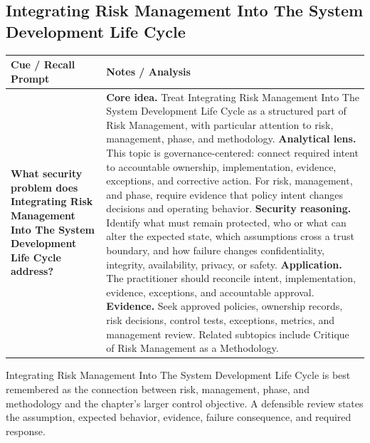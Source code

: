 \documentclass[11pt]{article}
\newcommand{\CornellHeader}{%
\rowcolor{Navy}\color{white}\bfseries Cue / Recall Prompt & \color{white}\bfseries Notes / Analysis\\\hline}
\newcommand{\CornellRow}[2]{%
\cellcolor{CueGray}\RaggedRight\textbf{#1} & \RaggedRight #2\\\hline}
\begin{document}
\subsection*{Integrating Risk Management Into The System Development Life Cycle}
\begin{longtable}{>{\RaggedRight\arraybackslash}p{}|>{\RaggedRight\arraybackslash}p{}}
\CornellHeader
\CornellRow{What security problem does Integrating Risk Management Into The System Development Life Cycle address?}{\textbf{Core idea.} Treat Integrating Risk Management Into The System Development Life Cycle as a structured part of Risk Management, with particular attention to risk, management, phase, and methodology. \textbf{Analytical lens.} This topic is governance-centered: connect required intent to accountable ownership, implementation, evidence, exceptions, and corrective action. For risk, management, and phase, require evidence that policy intent changes decisions and operating behavior. \textbf{Security reasoning.} Identify what must remain protected, who or what can alter the expected state, which assumptions cross a trust boundary, and how failure changes confidentiality, integrity, availability, privacy, or safety. \textbf{Application.} The practitioner should reconcile intent, implementation, evidence, exceptions, and accountable approval. \textbf{Evidence.} Seek approved policies, ownership records, risk decisions, control tests, exceptions, metrics, and management review. Related subtopics include Critique of Risk Management as a Methodology.}
\end{longtable}
\begin{topicsummary}
Integrating Risk Management Into The System Development Life Cycle is best remembered as the connection between risk, management, phase, and methodology and the chapter's larger control objective. A defensible review states the assumption, expected behavior, evidence, failure consequence, and required response.
\end{topicsummary}
\end{document}

